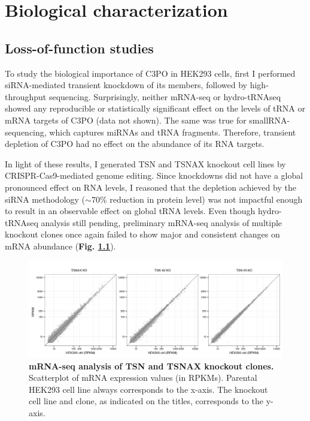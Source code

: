 \documentclass[12pt]{rockefeller}
\begin{document}
\chapter{Biological characterization}

\section{Loss-of-function studies}

To study the biological importance of C3PO in HEK293 cells, first I performed siRNA-mediated transient knockdown of its members, followed by high-throughput sequencing. Surprisingly, neither mRNA-seq or hydro-tRNAseq showed any reproducible or statistically significant effect on the levels of tRNA or mRNA targets of C3PO (data not shown). The same was true for smallRNA-sequencing, which captures miRNAs and tRNA fragments. Therefore, transient depletion of C3PO had no effect on the abundance of its RNA targets. 

In light of these results, I generated TSN and TSNAX knockout cell lines by CRISPR-Cas9-mediated genome editing. Since knockdowns did not have a global pronounced effect on RNA levels, I reasoned that the depletion achieved by the siRNA methodology ($\sim$70\% reduction in protein level) was not impactful enough to result in an observable effect on global tRNA levels. Even though hydro-tRNAseq analysis still pending, preliminary mRNA-seq analysis of multiple knockout clones once again failed to show major and consistent changes on mRNA abundance (\textbf{Fig. \ref{c3po_ko_mrna}}).

\begin{figure}[!ht]%
\centering
\includegraphics[width=\textwidth]{c3po_ko_mrnaseq.png} 
\caption[mRNAseq analysis of TSN and TSNAX knockout clones.]
{
\textbf{mRNA-seq analysis of TSN and TSNAX knockout clones.}
Scatterplot of mRNA expression values (in RPKMs). Parental HEK293 cell line always corresponds to the x-axis. The knockout cell line and clone, as indicated on the titles, corresponds to the y-axis.
}
\centering
\label{c3po_ko_mrna}%
\end{figure}
\end{document}
